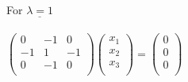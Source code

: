 \documentclass[12pt]{exam}
\begin{document}
\begin{questions}
\begin{solution}
\begin{enumerate}
	For $\underline{\lambda = 1}$\\ \\
	$\begin{pmatrix}
	0 & -1 & 0 \\
	-1 & 1 & -1 \\
	0 & -1  & 0 \\
	\end{pmatrix}\begin{pmatrix}
	x_1 \\
	x_2 \\
	x_3\\
	\end{pmatrix} = \begin{pmatrix}
	0 \\
	0 \\
	0\\
	\end{pmatrix} $
	

\end{enumerate}
\end{solution}
\end{questions}
\end{document}
